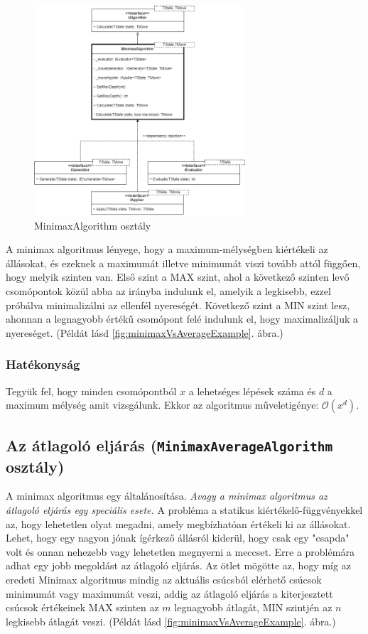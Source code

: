 \documentclass[twoside, a4paper, 12pt]{book}
\begin{document}
\begin{figure}[htbp]
	\centering
	\includegraphics[width=0.7\textwidth]{img/minimaxAbstractDiagram.png}
	\caption{MinimaxAlgorithm osztály}
	\label{fig:minimaxAbstractDiagram}
\end{figure}

A minimax algoritmus lényege, hogy a maximum-mélységben kiértékeli az állásokat, és ezeknek a maximumát illetve minimumát viszi tovább attól függően, hogy melyik szinten van. Első szint a MAX szint, ahol a következő szinten levő csomópontok közül abba az irányba indulunk el, amelyik a legkisebb, ezzel próbálva minimalizálni az ellenfél nyereségét. Következő szint a MIN szint lesz, ahonnan a legnagyobb értékű csomópont felé indulunk el, hogy maximalizáljuk a nyereséget. (Példát lásd \ref{fig:minimaxVsAverageExample}. ábra.)\cite{bevMiHu}
\subsubsection*{Hatékonyság} Tegyük fel, hogy minden csomópontból $x$ a lehetséges lépések száma és $d$ a maximum mélység amit vizsgálunk. Ekkor az algoritmus műveletigénye: $ \mathcal{O}(x^d)$.\cite{alfaBetaPruneHu}

\subsection{Az átlagoló eljárás (\texttt{MinimaxAverageAlgorithm} osztály)}
A minimax algoritmus egy általánosítása. \textit{Avagy a minimax algoritmus az átlagoló eljárás egy speciális esete.} A probléma a statikus kiértékelő-függvényekkel az, hogy lehetetlen olyat megadni, amely megbízhatóan értékeli ki az állásokat. Lehet, hogy egy nagyon jónak ígérkező állásról kiderül, hogy csak egy "csapda" volt és onnan nehezebb vagy lehetetlen megnyerni a meccset. Erre a problémára adhat egy jobb megoldást az átlagoló eljárás. Az ötlet mögötte az, hogy míg az eredeti Minimax algoritmus mindig az aktuális csúcsból elérhető csúcsok minimumát vagy maximumát veszi, addig az átlagoló eljárás a kiterjesztett csúcsok értékeinek MAX szinten az $m$ legnagyobb átlagát, MIN szintjén az $n$ legkisebb átlagát veszi. (Példát lásd \ref{fig:minimaxVsAverageExample}. ábra.)\cite{bevMiHu}
\end{document}
